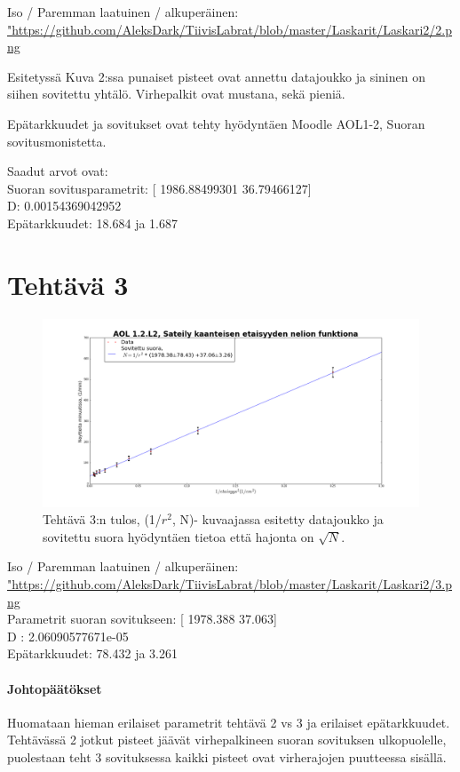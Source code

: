 \documentclass[a4paper, 12pt]{article}
\begin{document}
Iso / Paremman laatuinen / alkuperäinen: \url{"https://github.com/AleksDark/TiivisLabrat/blob/master/Laskarit/Laskari2/2.png}

Esitetyssä Kuva 2:ssa punaiset pisteet ovat annettu datajoukko ja  sininen on siihen sovitettu yhtälö. Virhepalkit ovat mustana, sekä pieniä.

Epätarkkuudet ja sovitukset ovat tehty hyödyntäen Moodle AOL1-2, Suoran sovitusmonistetta.

Saadut arvot ovat:\\
Suoran sovitusparametrit:  [ 1986.88499301    36.79466127]\\
D:  0.00154369042952 \\
Epätarkkuudet: 18.684 ja 1.687

\section*{Tehtävä 3}
\begin{figure}
\includegraphics[width=1\textwidth]{3}
\caption{Tehtävä 3:n tulos, (1/$r^2$, N)- kuvaajassa esitetty datajoukko ja sovitettu suora hyödyntäen tietoa että hajonta on $\sqrt{N}$.}
\end{figure}

Iso / Paremman laatuinen / alkuperäinen: \url{"https://github.com/AleksDark/TiivisLabrat/blob/master/Laskarit/Laskari2/3.png}\\

Parametrit suoran sovitukseen:  [ 1978.388    37.063]\\
D : 2.06090577671e-05\\
Epätarkkuudet:  78.432 ja 3.261


\paragraph{Johtopäätökset}
Huomataan hieman erilaiset parametrit tehtävä 2 vs 3 ja erilaiset epätarkkuudet. Tehtävässä 2 jotkut pisteet jäävät virhepalkineen suoran sovituksen ulkopuolelle, puolestaan teht 3 sovituksessa kaikki pisteet ovat virherajojen puutteessa sisällä.
\end{document}
